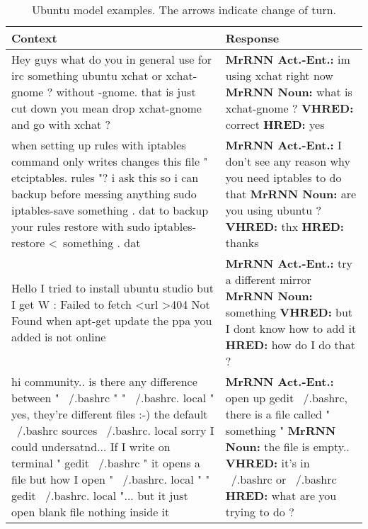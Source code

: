\documentclass{article}
\begin{document}
\begin{table}[ht]
 \caption{Ubuntu model examples. The arrows indicate change of turn.}
 \label{table:ubuntu-examples-small}
 \scriptsize
 \centering
 \begin{tabular}{p{75mm}|p{50mm}}
 \textbf{Context} & \textbf{Response} \\ \hline
         Hey guys what do you in general use for irc something ubuntu xchat or xchat-gnome ?  without -gnome. that is just cut down  you mean drop xchat-gnome and go with xchat ? & \textbf{MrRNN Act.\@ -Ent.\@:} im using xchat right now \newline \textbf{MrRNN Noun:} what is xchat-gnome ? \newline \textbf{VHRED:} correct \newline \textbf{HRED:} yes \\ \hline 
        when setting up rules with iptables command only writes changes this file " \/etc\/iptables. rules "? i ask this so i can backup before messing anything  sudo iptables-save something . dat to backup your rules restore with sudo iptables-restore \textless \ something . dat & \textbf{MrRNN Act.\@ -Ent.\@:} I don't see any reason why you need iptables to do that \newline \textbf{MrRNN Noun:} are you using ubuntu ? \newline \textbf{VHRED:} thx \newline \textbf{HRED:} thanks \\ \hline 
        Hello I tried to install ubuntu studio but I get W : Failed to fetch \textless url \textgreater 404 Not Found when apt-get update  the ppa you added is not online & \textbf{MrRNN Act.\@ -Ent.\@:} try a different mirror \newline \textbf{MrRNN Noun:} something \newline \textbf{VHRED:} but I dont know how to add it \newline \textbf{HRED:} how do I do that ? \\ \hline 
        hi community.. is there any difference between " ~/.bashrc " " ~/.bashrc. local "  yes, they're different files :-) the default ~/.bashrc sources ~/.bashrc. local  sorry I could undersatnd... If I write on terminal " gedit ~/.bashrc " it opens a file but how I open " ~/.bashrc. local "  " gedit ~/.bashrc. local "...  but it just open blank file nothing inside it & \textbf{MrRNN Act.\@ -Ent.\@:} open up gedit ~/.bashrc, there is a file called " something " \newline \textbf{MrRNN Noun:} the file is empty.. \newline \textbf{VHRED:} it's in ~/.bashrc or ~/.bashrc  \newline \textbf{HRED:} what are you trying to do ? \\
 \bottomrule
 \end{tabular}
\end{table}
\end{document}
